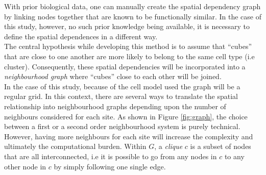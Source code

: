 With prior biological data, one can manually create the spatial dependency graph by linking nodes together that are known to be functionally similar. In the case of this study, however, no such prior knowledge being available, it is necessary to define the spatial dependences in a different way.\\

The central hypothesis while developing this method is to assume that ``cubes'' that are close to one another are more likely to belong to the same cell type (i.e cluster). Consequently, these spatial dependencies will be incorporated into a \emph{neighbourhood graph} where  ``cubes'' close to each other will be joined.\\

In the case of this study, because of the cell model used the graph will be a regular grid. In this context, there are several ways to translate the spatial relationship into neighbourhood graphs depending upon the number of neighbours considered for each site. As shown in Figure \ref{fig:graph}, the choice between a first or a second order neighbourhood system is purely technical. However, having more neighbours for each site will increase the complexity and ultimately the computational burden. Within $G$, a \emph{clique} $c$ is a subset of nodes that are all interconnected, i.e it is possible to go from any nodes in $c$ to any other node in $c$ by simply following one single edge.\\

